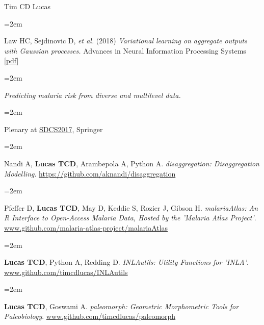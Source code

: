 \documentclass{scrartcl}
\newcommand{\MarginText}[1]{\marginpar{\raggedleft\itshape\small#1}} %
\newcommand{\Description}[1]{\hangindent=2em\hangafter=0\noindent\raggedright\footnotesize{#1}\par\normalsize\vspace{1em}} %
\newcommand{\MoreDescription}[1]{\hangindent=2em\hangafter=0\noindent\raggedright\scriptsize{#1}\par\normalsize\vspace{1em}} %
\begin{document}
\begin{cv}{Tim {\Large CD} Lucas}
{\color{Maroon}}\vspace{1em}


\Description{\MarginText{2018}Law HC, Sejdinovic D, \emph{et al.} (2018) \emph{Variational learning on aggregate outputs with Gaussian processes.} Advances in Neural Information Processing Systems [\href{http://papers.nips.cc/paper/7847-variational-learning-on-aggregate-outputs-with-gaussian-processes.pdf}{pdf}]}


\vspace{1em} %



{\color{Maroon}}\vspace{1em}

\Description{\MarginText{2017}\emph{Predicting malaria risk from diverse and multilevel data.}}\vspace{-1em}
\MoreDescription{Plenary at \href{http://www.springer.com/gb/book/9789811072413}{SDCS2017}, Springer}
\vspace{-0.5em}




{\color{Maroon}}\vspace{1em}


\Description{Nandi A, \textbf{Lucas TCD}, Arambepola A, Python A. \emph{disaggregation: Disaggregation Modelling}. \url{https://github.com/aknandi/disaggregation}}


\Description{Pfeffer D, \textbf{Lucas TCD}, May D, Keddie S, Rozier J, Gibson H. \emph{malariaAtlas: An R Interface to Open-Access Malaria Data, Hosted by the 'Malaria Atlas Project'}. \url{www.github.com/malaria-atlas-project/malariaAtlas}}

\Description{\textbf{Lucas TCD}, Python A, Redding D. \emph{INLAutils: Utility Functions for 'INLA'}. \url{www.github.com/timcdlucas/INLAutils}}


\Description{\textbf{Lucas TCD}, Goswami A. \emph{paleomorph: Geometric Morphometric Tools for Paleobiology}. \url{www.github.com/timcdlucas/paleomorph}}


\end{cv}
\end{document}
